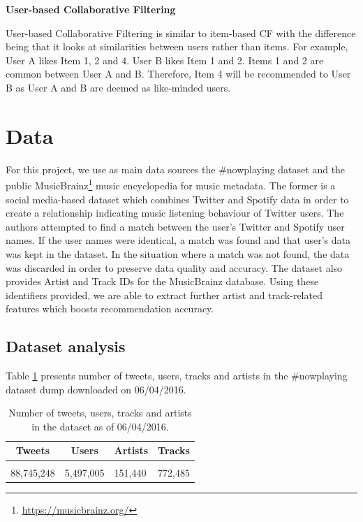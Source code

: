 \documentclass{article} %
\begin{document}
\textbf{User-based Collaborative Filtering}

User-based Collaborative Filtering is similar to item-based CF with the difference being that it looks at similarities between users rather than items. For example, User A likes Item 1, 2 and 4. User B likes Item 1 and 2. Items 1 and 2 are common between User A and B. Therefore, Item 4 will be recommended to User B as User A and B are deemed as like-minded users.

\section{Data}

For this project, we use as main data sources the \#nowplaying dataset \cite{zangerle2014nowplaying} and the public MusicBrainz\footnote{\url{https://musicbrainz.org/}} music encyclopedia for music metadata. The former is a social media-based dataset which combines Twitter and Spotify data in order to create a relationship indicating music listening behaviour of Twitter users. The authors attempted to find a match between the user's Twitter and Spotify user names. If the user names were identical, a match was found and that user's data was kept in the dataset. In the situation where a match was not found, the data was discarded in order to preserve data quality and accuracy. The dataset also provides Artist and Track IDs for the MusicBrainz database. Using these identifiers provided, we are able to extract further artist and track-related features which boosts recommendation accuracy.

\subsection{Dataset analysis}

Table \ref{table:1} presents number of tweets, users, tracks and artists in the \#nowplaying dataset dump downloaded on 06/04/2016.

\begin{table}[!htbp]
\caption{Number of tweets, users, tracks and artists in the dataset as of 06/04/2016.}
\label{table:1}
\begin{center}
\begin{tabular}{l l l l}
\multicolumn{1}{c}{\bf Tweets} & \multicolumn{1}{c}{\bf Users} & \multicolumn{1}{c}{\bf Artists} & \multicolumn{1}{c}{\bf Tracks}
\\ \hline \\
88,745,248 & 5,497,005 & 151,440 & 772,485\\
\end{tabular}
\end{center}
\end{table}
\end{document}

